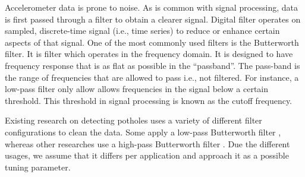 Accelerometer data is prone to noise. As is common with signal processing, data is first passed through a filter to obtain a clearer signal. Digital filter operates on sampled, discrete-time signal (i.e., time series) to reduce or enhance certain aspects of that signal. One of the most commonly used filters is the Butterworth filter. It is filter which operates in the frequency domain. It is designed to have frequency response that is as flat as possible in the ``passband''. The pass-band is the range of frequencies that are allowed to pass i.e., not filtered. For instance, a low-pass filter only allow allows frequencies in the signal below a certain threshold. This threshold in signal processing is known as the cutoff frequency.

Existing research on detecting potholes uses a variety of different filter configurations to clean the data. Some apply a low-pass Butterworth filter \cite{Gupta2020}, whereas other researches use a high-pass Butterworth filter \cite{Wu2020, Janani2020}. Due the different usages, we assume that it differs per application and approach it as a possible tuning parameter.







